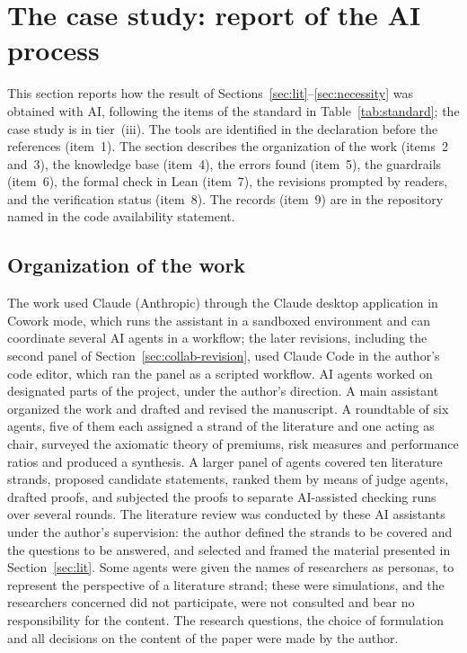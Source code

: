 \section{The case study: report of the AI process}\label{sec:collab}

This section reports how the result of Sections~\ref{sec:lit}--\ref{sec:necessity} was obtained with AI, following
the items of the standard in Table~\ref{tab:standard}; the case study is in tier~(iii). The tools are identified in
the declaration before the references (item~1). The section describes the organization of the work (items~2
and~3), the knowledge base (item~4), the errors found (item~5), the guardrails (item~6), the formal check in Lean
(item~7), the revisions prompted by readers, and the verification status (item~8). The records (item~9) are in the
repository named in the code availability statement.

\subsection{Organization of the work}\label{sec:collab-org}

The work used Claude (Anthropic) through the Claude desktop application in Cowork mode, which runs the assistant in
a sandboxed environment and can coordinate several AI agents in a workflow; the later revisions, including the
second panel of Section~\ref{sec:collab-revision}, used Claude Code in the author's code editor, which ran the panel
as a scripted workflow. AI agents worked on designated parts of
the project, under the author's direction. A main assistant organized the work and drafted and revised the
manuscript. A roundtable of six agents, five of them each assigned a strand of the literature and one acting as
chair, surveyed the axiomatic theory of premiums, risk measures and performance ratios and produced a synthesis. A
larger panel of agents covered ten literature strands, proposed candidate statements, ranked them by means of judge
agents, drafted proofs, and subjected the proofs to separate AI-assisted checking runs over several rounds. The
literature review was conducted by these AI assistants under the author's supervision: the author defined the
strands to be covered and the questions to be answered, and selected and framed the material presented in
Section~\ref{sec:lit}. Some agents were given the names of researchers as personas, to represent the
perspective of a literature strand; these were simulations, and the researchers concerned did not participate, were
not consulted and bear no responsibility for the content. The research questions, the choice of formulation and all
decisions on the content of the paper were made by the author.

